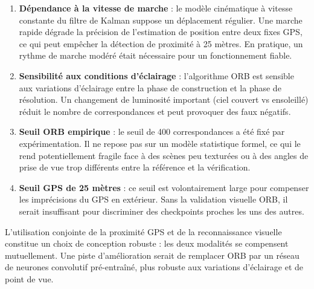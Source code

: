 \begin{enumerate}
    \item \textbf{Dépendance à la vitesse de marche} : le modèle cinématique
    à vitesse constante du filtre de Kalman suppose un déplacement régulier.
    Une marche rapide dégrade la précision de l'estimation de position entre
    deux fixes GPS, ce qui peut empêcher la détection de proximité à 25 mètres.
    En pratique, un rythme de marche modéré était nécessaire pour un
    fonctionnement fiable.

    \item \textbf{Sensibilité aux conditions d'éclairage} : l'algorithme ORB
    est sensible aux variations d'éclairage entre la phase de construction et
    la phase de résolution. Un changement de luminosité important (ciel couvert
    vs ensoleillé) réduit le nombre de correspondances et peut provoquer des
    faux négatifs.

    \item \textbf{Seuil ORB empirique} : le seuil de 400 correspondances a
    été fixé par expérimentation. Il ne repose pas sur un modèle statistique
    formel, ce qui le rend potentiellement fragile face à des scènes peu
    texturées ou à des angles de prise de vue trop différents entre la
    référence et la vérification.

    \item \textbf{Seuil GPS de 25 mètres} : ce seuil est volontairement large
    pour compenser les imprécisions du GPS en extérieur. Sans la validation
    visuelle ORB, il serait insuffisant pour discriminer des checkpoints
    proches les uns des autres.
\end{enumerate}



L'utilisation conjointe de la proximité GPS et de la reconnaissance visuelle
constitue un choix de conception robuste : les deux modalités se compensent
mutuellement. Une piste d'amélioration serait de remplacer ORB par un
réseau de neurones convolutif pré-entraîné, plus robuste aux variations
d'éclairage et de point de vue.